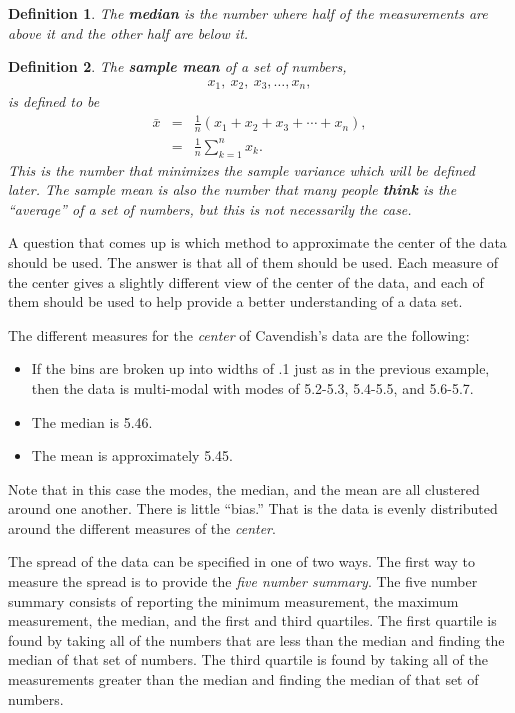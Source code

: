 \documentclass[12pt]{article}
\newtheorem{definition}{Definition}[section]
\newcommand{\lp}{\left(}
\newcommand{\rp}{\right)}
\begin{document}
\begin{definition}
  The \textbf{median} is the number where half of the measurements are
  above it and the other half are below it.
\end{definition}

\begin{definition}
  The \textbf{sample mean} of a set of numbers,
  \begin{eqnarray}
    \label{eqn:sampleObservations}
    x_1,~x_2,~x_3,\ldots,x_n,
  \end{eqnarray}
  is defined to be
  \begin{eqnarray}
    \label{eqn:sampleMean}
    \bar{x} & = & \frac{1}{n} \lp x_1 + x_2 + x_3 + \cdots + x_n \rp, \\
    & = & \frac{1}{n} \sum^n_{k=1} x_k. \nonumber
  \end{eqnarray}
  This is the number that minimizes the sample variance which will be
  defined later. The sample mean is also the number that many people
  \textbf{think} is the ``average'' of a set of numbers, but this is
  not necessarily the case.
\end{definition}

A question that comes up is which method to approximate the center of
the data should be used. The answer is that all of them should be
used. Each measure of the center gives a slightly different view of
the center of the data, and each of them should be used to help
provide a better understanding of a data set.

The different measures for the \textit{center} of Cavendish's data are
the following:
\begin{itemize}
\item If the bins are broken up into widths of .1 just as in the
  previous example, then the data is multi-modal with modes of
  5.2-5.3, 5.4-5.5, and 5.6-5.7.
\item The median is 5.46.
\item The mean is approximately 5.45.
\end{itemize}
Note that in this case the modes, the median, and the mean are all
clustered around one another. There is little ``bias.'' That is the
data is evenly distributed around the different measures of the
\textit{center}.


The spread of the data can be specified in one of two ways. The first
way to measure the spread is to provide the \textit{five number
  summary}. The five number summary consists of reporting the minimum
measurement, the maximum measurement, the median, and the first and
third quartiles. The first quartile is found by taking all of the
numbers that are less than the median and finding the median of that
set of numbers. The third quartile is found by taking all of the
measurements greater than the median and finding the median of that
set of numbers.
\end{document}
